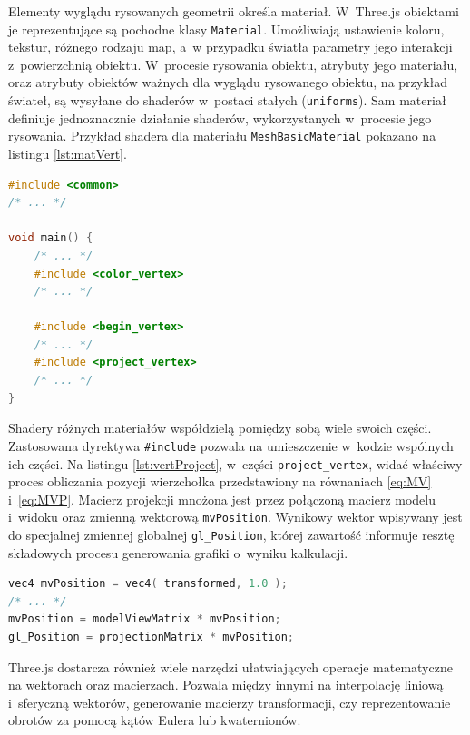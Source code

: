 Elementy wyglądu rysowanych geometrii określa materiał. W~Three.js obiektami je reprezentujące są pochodne klasy \texttt{Material}. Umożliwiają ustawienie koloru, tekstur, różnego rodzaju map, a~w przypadku światła parametry jego interakcji z~powierzchnią obiektu. W~procesie rysowania obiektu, atrybuty jego materiału, oraz atrybuty obiektów ważnych dla wyglądu rysowanego obiektu, na przykład świateł, są wysyłane do shaderów w~postaci stałych (\texttt{uniforms}). Sam materiał definiuje jednoznacznie działanie shaderów, wykorzystanych w~procesie jego rysowania. Przykład shadera dla materiału \texttt{MeshBasicMaterial} pokazano na listingu \ref{lst:matVert}.

\begin{lstlisting}[language=C++, label={lst:matVert}, caption={
    Fragmenty vertex shadera materiału \texttt{MeshBasicMaterial}}
]
#include <common>
/* ... */

void main() {
    /* ... */
	#include <color_vertex>
    /* ... */

	#include <begin_vertex>
	/* ... */
	#include <project_vertex>
	/* ... */
}
\end{lstlisting}

Shadery różnych materiałów współdzielą pomiędzy sobą wiele swoich części. Zastosowana dyrektywa \texttt{\#include} pozwala na umieszczenie w~kodzie wspólnych ich części. Na listingu \ref{lst:vertProject}, w~części \texttt{project\_vertex}, widać właściwy proces obliczania pozycji wierzchołka przedstawiony na równaniach \ref{eq:MV} i~\ref{eq:MVP}. Macierz projekcji mnożona jest przez połączoną macierz modelu i~widoku oraz zmienną wektorową \texttt{mvPosition}. Wynikowy wektor wpisywany jest do specjalnej zmiennej globalnej \texttt{gl\_Position}, której zawartość informuje resztę składowych procesu generowania grafiki o~wyniku kalkulacji. 

\begin{lstlisting}[language=C++, label={lst:vertProject}, caption={
    Fragmenty części \texttt{project\_vertex} vertex shadera}
]
vec4 mvPosition = vec4( transformed, 1.0 );
/* ... */
mvPosition = modelViewMatrix * mvPosition;
gl_Position = projectionMatrix * mvPosition;
\end{lstlisting}

Three.js dostarcza również wiele narzędzi ułatwiających operacje matematyczne na wektorach oraz macierzach. Pozwala między innymi na interpolację liniową i~sferyczną wektorów, generowanie macierzy transformacji, czy reprezentowanie obrotów za pomocą kątów Eulera lub kwaternionów.

